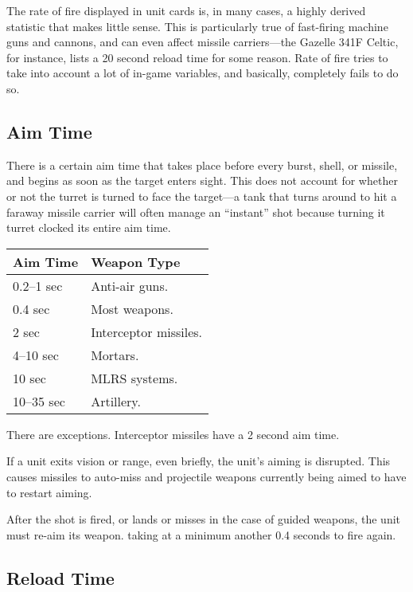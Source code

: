 \documentclass{article}
\begin{document}
The rate of fire displayed in unit cards is, in many cases, a highly derived
statistic that makes little sense. This is particularly true of fast-firing
machine guns and cannons, and can even affect missile carriers---the Gazelle
341F Celtic, for instance, lists a 20 second reload time for some reason. Rate
of fire tries to take into account a lot of in-game variables, and
basically, completely fails to do so.

\subsection{Aim Time}

There is a certain aim time that takes place before every burst,
shell, or missile, and begins as soon as the target enters sight. This does not
account for whether or not the turret is turned to face the target---a tank
that turns around to hit a faraway missile carrier will often manage an
``instant'' shot because turning it turret clocked its entire aim
time.

\begin{center}
    \begin{tabular}{ | l | l | }
    \hline
    Aim Time & Weapon Type \\ \hline
    0.2--1 sec & Anti-air guns. \\
    0.4 sec & Most weapons. \\
    2 sec & Interceptor missiles. \\ 
    4--10 sec & Mortars. \\
    10 sec & MLRS systems. \\
    10--35 sec & Artillery. \\
    \hline
    \end{tabular}
\end{center}

There are exceptions. Interceptor missiles have a 2 second aim time.

If a unit exits vision or range, even briefly, the unit's aiming is disrupted.
This causes missiles to auto-miss and projectile weapons currently being aimed
to have to restart aiming.

After the shot is fired, or lands or misses in the case of guided weapons, the
unit must re-aim its weapon. taking at a minimum another 0.4 seconds to fire
again.

\subsection{Reload Time}
\end{document}
